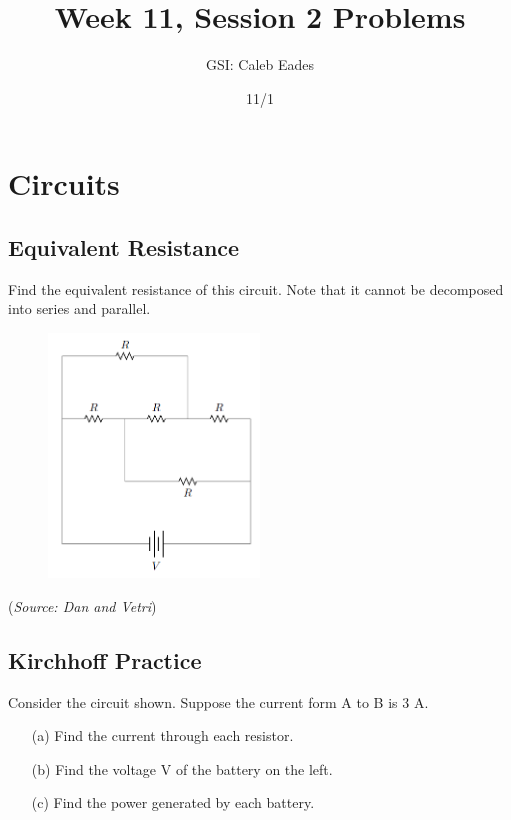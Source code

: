 \documentclass{article}
\begin{document}
\title{Week 11, Session 2 Problems}
\author{GSI: Caleb Eades}
\date{11/1}
\maketitle

\section{Circuits}

\subsection{Equivalent Resistance}

Find the equivalent resistance of this circuit. Note that it cannot be decomposed into series and parallel.

\begin{figure}[h]
	\begin{center}
	\includegraphics[width=0.5\textwidth]{Circuit.png}
	\end{center}
\end{figure}

(\textit{Source: Dan and Vetri})

\subsection{Kirchhoff Practice}

Consider the circuit shown. Suppose the current form A to B is 3 A.
\begin{itemize}
	\item[(a)] Find the current through each resistor.
	\item[(b)] Find the voltage V of the battery on the left.
	\item[(c)] Find the power generated by each battery.
\end{itemize}
\end{document}
